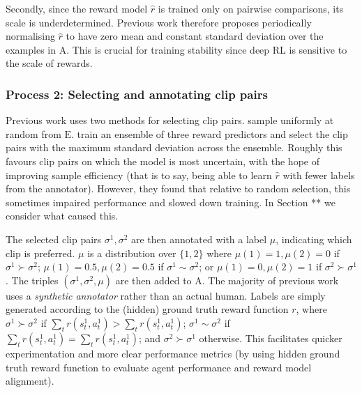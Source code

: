 \documentclass[11pt, a4paper, bibliography=totoc]{report}
\newcommand{\rp}{\hat{r}}
\newcommand{\expbuff}{\mathrm{E}}
\newcommand{\annbuff}{\mathrm{A}}
\begin{document}
Secondly, since the reward model $ \rp $ is trained only on pairwise comparisons, its scale is underdetermined. Previous work therefore proposes periodically normalising $ \rp $ to have zero mean and constant standard deviation over the examples in $ \annbuff $. This is crucial for training stability since deep RL is sensitive to the scale of rewards. %

\subsubsection{Process 2: Selecting and annotating clip pairs}
Previous work uses two methods for selecting clip pairs. \cite{Ibarz2018} sample uniformly at random from $ \expbuff $. \cite{Christiano2017} train an ensemble of three reward predictors and select the clip pairs with the maximum standard deviation across the ensemble. Roughly this favours clip pairs on which the model is most uncertain, with the hope of improving sample efficiency (that is to say, being able to learn $ \rp $ with fewer labels from the annotator). However, they found that relative to random selection, this sometimes impaired performance and slowed down training. In Section ** we consider what caused this.

The selected clip pairs $ \sigma^1, \sigma^2 $ are then annotated with a label $ \mu $, indicating which clip is preferred. $ \mu $ is a distribution over $ \{1,2\} $ where $ \mu(1) = 1, \mu(2) = 0 $ if $ \sigma^1 \succ \sigma^2 $; $ \mu(1) = 0.5, \mu(2) = 0.5 $ if $ \sigma^1 \sim \sigma^2 $; or $ \mu(1) = 0, \mu(2) = 1 $ if $ \sigma^2 \succ \sigma^1 $. The triples $ (\sigma^1, \sigma^2, \mu) $ are then added to $ \annbuff $. The majority of previous work uses a \textit{synthetic annotator} rather than an actual human. Labels are simply generated according to the (hidden) ground truth reward function $ r $, where $ \sigma^1 \succ \sigma^2 $ if $ \sum_t r(s_t^1, a_t^1) > \sum_t r(s_t^1, a_t^1) $; $ \sigma^1 \sim \sigma^2 $ if $ \sum_t r(s_t^1, a_t^1) = \sum_t r(s_t^1, a_t^1) $; and $ \sigma^2 \succ \sigma^1 $ otherwise. This facilitates quicker experimentation and more clear performance metrics (by using hidden ground truth reward function to evaluate agent performance and reward model alignment).
\end{document}
